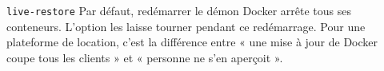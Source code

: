 \begin{notion}{\texttt{live-restore}}
Par défaut, redémarrer le démon Docker arrête tous ses conteneurs. L'option
 les laisse tourner pendant ce redémarrage. Pour une
plateforme de location, c'est la différence entre « une mise à jour de Docker
coupe tous les clients » et « personne ne s'en aperçoit ».
\end{notion}
